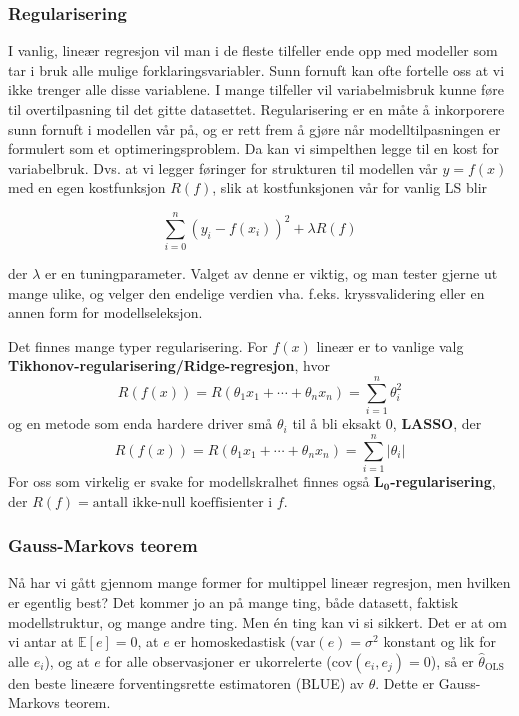 \subsubsection{Regularisering}
I vanlig, lineær regresjon vil man i de fleste tilfeller ende opp med modeller som tar i bruk alle mulige forklaringsvariabler. Sunn fornuft kan ofte fortelle oss at vi ikke trenger alle disse variablene. I mange tilfeller vil variabelmisbruk kunne føre til overtilpasning til det gitte datasettet. Regularisering er en måte å inkorporere sunn fornuft i modellen vår på, og er rett frem å gjøre når modelltilpasningen er formulert som et optimeringsproblem. Da kan vi simpelthen legge til en kost for variabelbruk. Dvs. at vi legger føringer for strukturen til modellen vår $y = f(x)$ med en egen kostfunksjon $R(f)$, slik at kostfunksjonen vår for vanlig LS blir

\begin{equation}
	\sum_{i=0}^{n}(y_i - f(x_i))^2 + \lambda R(f)
\end{equation}

der $\lambda$ er en tuningparameter. Valget av denne er viktig, og man tester gjerne ut mange ulike, og velger den endelige verdien vha. f.eks. kryssvalidering eller en annen form for modellseleksjon.

Det finnes mange typer regularisering. For $f(x)$ lineær er to vanlige valg \textbf{Tikhonov-regularisering/Ridge-regresjon}, hvor 
\begin{equation}
	R(f(x)) = R(\theta_1 x_1 + \cdots + \theta_n x_n) = \sum_{i = 1}^n \theta_i^2
\end{equation}
og en metode som enda hardere driver små $\theta_i$ til å bli eksakt 0, \textbf{LASSO}, der
\begin{equation}
	R(f(x)) = R(\theta_1 x_1 + \cdots + \theta_n x_n) = \sum_{i = 1}^n | \theta_i |
\end{equation}
For oss som virkelig er svake for modellskralhet finnes også \textbf{$\mathbf{L_0}$-regularisering}, der $R(f) = \textrm{antall ikke-null koeffisienter i } f$.

\subsubsection{Gauss-Markovs teorem}
Nå har vi gått gjennom mange former for multippel lineær regresjon, men hvilken er egentlig best? Det kommer jo an på mange ting, både datasett, faktisk modellstruktur, og mange andre ting. Men én ting kan vi si sikkert. Det er at om vi antar at $\mathbb{E}[e] = 0$, at $e$ er homoskedastisk ($\textrm{var}(e) = \sigma^2$ konstant og lik for alle $e_i$), og at $e$ for alle observasjoner er ukorrelerte ($\textrm{cov}(e_i, e_j) = 0$), så er $\hat{\theta}_\textrm{OLS}$ den beste lineære forventingsrette estimatoren (BLUE) av $\theta$. Dette er Gauss-Markovs teorem.
